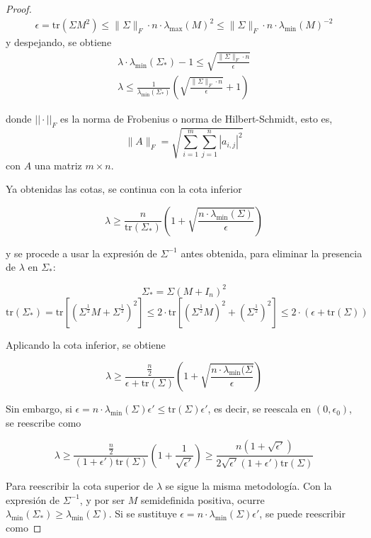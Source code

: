 \begin{itemize}
\begin{proof}
\begin{align*}
\epsilon = \text{tr}(\Sigma M^2) \leq \|\Sigma \|_F \cdot n \cdot \lambda_{\text{max}}(M)^2 \leq \|\Sigma \|_F \cdot n \cdot \lambda_{\text{min}}(M)^{-2}
\end{align*}
y despejando, se obtiene
\begin{align*}
\lambda \cdot \lambda_{\text{min}}(\Sigma_*) - 1 \leq \sqrt{\frac{\|\Sigma \|_F \cdot n}{\epsilon}} \\
\lambda \leq \frac{1}{\lambda_{\text{min}}(\Sigma_*)} \left( \sqrt{\frac{\|\Sigma \|_F \cdot n}{\epsilon}} + 1 \right)
\end{align*}

donde $||\cdot||_F$ es la norma de Frobenius o norma de Hilbert-Schmidt, esto es, 
$$\|A \|_F = \sqrt{\sum_{i=1}^m \sum_{j=1}^n |a_{i,j}|^2}$$
con $A$ una matriz $m \times n$.

Ya obtenidas las cotas, se continua con la cota inferior

$$\lambda \geq \frac{n}{\text{tr}(\Sigma_*)} \left( 1 + \sqrt{\frac{n \cdot \lambda_{\text{min}}(\Sigma)}{\epsilon}} \right)$$

y se procede a usar la expresión de $\Sigma^{-1}$ antes obtenida, para eliminar la presencia de $\lambda$ en $\Sigma_*$:

$$\Sigma_* = \Sigma (M+I_n)^2 $$
$$\text{tr}(\Sigma_*) = \text{tr} \left[ (\Sigma^{\frac{1}{2}} M + \Sigma^{\frac{1}{2}})^2 \right] \leq 2 \cdot \text{tr} \left[ (\Sigma^{\frac{1}{2}} M)^2 + (\Sigma^{\frac{1}{2}})^2 \right] \leq 2 \cdot (\epsilon + \text{tr}(\Sigma))$$

Aplicando la cota inferior, se obtiene

$$\lambda \geq \frac{\frac{n}{2}}{\epsilon + \text{tr}(\Sigma)} \left( 1 + \sqrt{\frac{n \cdot \lambda_{\text{min}}(\Sigma}{\epsilon}} \right)$$

Sin embargo, si $\epsilon = n \cdot \lambda_{\text{min}}(\Sigma) \epsilon' \leq \text{tr}(\Sigma) \epsilon'$, es decir, se reescala en $(0,\epsilon_0)$, se reescribe como

$$\lambda \geq \frac{\frac{n}{2}}{(1+\epsilon')\text{tr}(\Sigma)} \left( 1 + \frac{1}{\sqrt{\epsilon'}} \right) \geq \frac{n (1+\sqrt{\epsilon'})}{2 \sqrt{\epsilon'}(1+\epsilon')\text{tr}(\Sigma)}$$

Para reescribir la cota superior de $\lambda$ se sigue la misma metodología. Con la expresión de $\Sigma^{-1}$, y por ser $M$ semidefinida positiva, ocurre $\lambda_{\text{min}}(\Sigma_*) \geq \lambda_{\text{min}}(\Sigma)$. Si se sustituye $\epsilon = n \cdot \lambda_{\text{min}}(\Sigma) \epsilon'$, se puede reescribir como


\end{proof}
\end{itemize}
